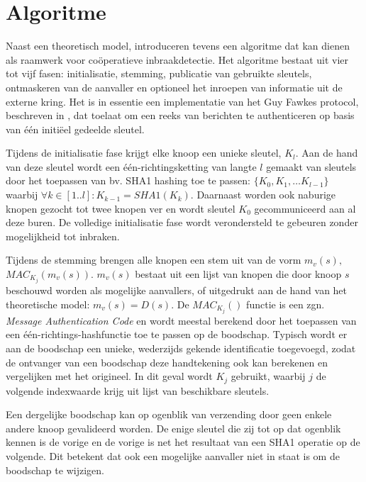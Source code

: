 \section{Algoritme}
\label{section:cooperation-algorithm}

Naast een theoretisch model, introduceren \citep{krontiris2009cooperative}
tevens een algoritme dat kan dienen als raamwerk voor co\"operatieve
inbraakdetectie. Het algoritme bestaat uit vier tot vijf fasen: initialisatie,
stemming, publicatie van gebruikte sleutels, ontmaskeren van de aanvaller en
optioneel het inroepen van informatie uit de externe kring. Het is in essentie
een implementatie van het Guy Fawkes protocol, beschreven in
\citep{anderson1998new}, dat toelaat om een reeks van berichten te authenticeren
op basis van \'e\'en initi\"eel gedeelde sleutel.

Tijdens de initialisatie fase krijgt elke knoop een unieke sleutel, $K_l$. Aan
de hand van deze sleutel wordt een \'e\'en-richtingsketting van langte $l$
gemaakt van sleutels door het toepassen van bv. SHA1 \citep{rfc:3174} hashing
toe te passen: $\{K_0, K_1, \dots K_{l-1}\}$ waarbij $\forall k \in [1..l] :
K_{k-1} = SHA1(K_k)$. Daarnaast worden ook naburige knopen gezocht tot twee
knopen ver en wordt sleutel $K_0$ gecommuniceerd aan al deze buren. De
volledige initialisatie fase wordt verondersteld te gebeuren zonder
mogelijkheid tot inbraken.

Tijdens de stemming brengen alle knopen een stem uit van de vorm $m_v(s),$ $
MAC_{K_j}(m_v(s))$. $m_v(s)$ bestaat uit een lijst van knopen die door knoop
$s$ beschouwd worden als mogelijke aanvallers, of uitgedrukt aan de hand van
het theoretische model: $m_v(s) = D(s)$. De $MAC_{K_j}()$ functie is een zgn.
\emph{Message Authentication Code} \citep{rfc:2104} en wordt meestal berekend
door het toepassen van een \'e\'en-richtings-hashfunctie toe te passen op de
boodschap. Typisch wordt er aan de boodschap een unieke, wederzijds gekende
identificatie toegevoegd, zodat de ontvanger van een boodschap deze
handtekening ook kan berekenen en vergelijken met het origineel. In dit geval
wordt $K_j$ gebruikt, waarbij $j$ de volgende indexwaarde krijg uit lijst van
beschikbare sleutels.

Een dergelijke boodschap kan op ogenblik van verzending door geen enkele andere
knoop gevalideerd worden. De enige sleutel die zij tot op dat ogenblik kennen
is de vorige en de vorige is net het resultaat van een SHA1 operatie op de
volgende. Dit betekent dat ook een mogelijke aanvaller niet in staat is om de
boodschap te wijzigen.

